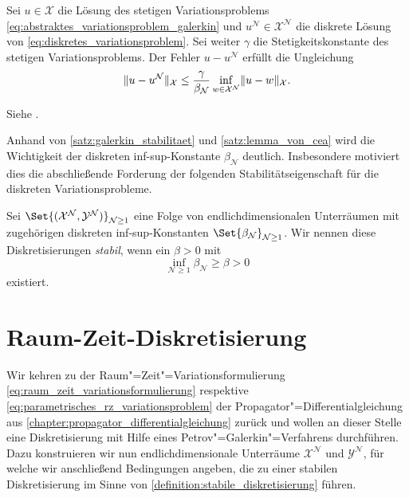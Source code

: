 \documentclass[../main.tex]{subfiles}
\begin{document}
\begin{Satz}
    \label{satz:lemma_von_cea}
    Sei $u \in \mathcal X$ die Lösung des stetigen Variationsproblems \cref{eq:abstraktes_variationsproblem_galerkin} und $u^{\mathcal N} \in \mathcal X^{\mathcal N}$ die diskrete Lösung von \cref{eq:diskretes_variationsproblem}.
    Sei weiter $\gamma$ die Stetigkeitskonstante des stetigen Variationsproblems.
    Der Fehler $u - u^{\mathcal N}$ erfüllt die Ungleichung
    \begin{equation}
        \label{eq:lemma_von_cea}
        \lVert u - u^{\mathcal N}\rVert_{\mathcal X} \leq \frac{\gamma}{\beta_{\mathcal N}} \inf_{w \in \mathcal X^{\mathcal N}} \lVert u - w\rVert_{\mathcal X}.
    \end{equation}

    \begin{Beweis}
        Siehe \cite[Theorem 3.2]{Nochetto:2009il}.
    \end{Beweis}
\end{Satz}

Anhand von \cref{satz:galerkin_stabilitaet} und \cref{satz:lemma_von_cea} wird die Wichtigkeit der diskreten inf-sup-Konstante $\beta_{\mathcal N}$ deutlich.
Insbesondere motiviert dies die abschließende Forderung der folgenden Stabilitätseigenschaft für die diskreten Variationsprobleme.

\begin{Definition}
\label{definition:stabile_diskretisierung}
    Sei $\Set{(\mathcal X^{\mathcal N}, \mathcal Y^{\mathcal N})}_{\mathcal N \geq 1}$ eine Folge von endlichdimensionalen Unterräumen mit zugehörigen diskreten inf-sup-Konstanten $\Set{\beta_{\mathcal N}}_{\mathcal N \geq 1}$.
    Wir nennen diese Diskretisierungen \emph{stabil}, wenn ein $\beta > 0$ mit
    \begin{equation}
        \inf_{\mathcal N \geq 1} \beta_{\mathcal N} \geq \beta > 0
    \end{equation}
    existiert.
\end{Definition}


\section{Raum-Zeit-Diskretisierung} %
\label{section:raum_zeit_diskretisierung}

Wir kehren zu der Raum"=Zeit"=Variationsformulierung \cref{eq:raum_zeit_variationsformulierung} respektive \cref{eq:parametrisches_rz_variationsproblem} der Propagator"=Differentialgleichung aus \cref{chapter:propagator_differentialgleichung} zurück und wollen an dieser Stelle eine Diskretisierung mit Hilfe eines Petrov"=Galerkin"=Verfahrens durchführen.
Dazu konstruieren wir nun endlichdimensionale Unterräume $\mathcal X^{\mathcal N}$ und $\mathcal Y^{\mathcal N}$, für welche wir anschließend Bedingungen angeben, die zu einer stabilen Diskretisierung im Sinne von \cref{definition:stabile_diskretisierung} führen.
\end{document}
